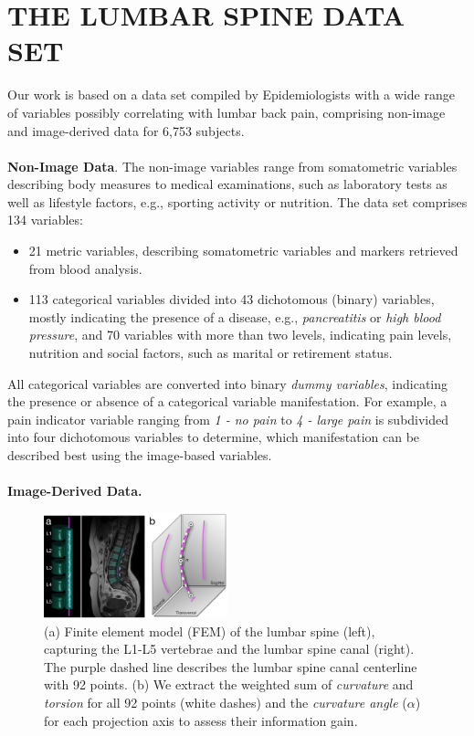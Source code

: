 \documentclass[a4paper,twoside]{style/article}
\begin{document}
\section{\uppercase{The Lumbar Spine Data Set}}
\label{sec:MaterialsAndMethod}
\noindent Our work is based on a data set compiled by Epidemiologists with a wide range of variables possibly correlating with lumbar back pain, comprising non-image and image-derived data for 6,753 subjects.
\\\\
\noindent \textbf{Non-Image Data}.
The non-image variables range from somatometric variables describing body measures to medical examinations, such as laboratory tests as well as lifestyle factors, e.g., sporting activity or nutrition.
The data set comprises 134 variables: %
\begin{itemize}
	\item 21 metric variables, describing somatometric variables and markers retrieved from blood analysis.
	\item 113 categorical variables divided into 43 dichotomous (binary) variables, mostly indicating the presence of a disease, e.g., \emph{pancreatitis} or \emph{high blood pressure}, and 70 variables with more than two levels, indicating pain levels, nutrition and social factors, such as marital or retirement status.
\end{itemize}
All categorical variables are converted into binary \emph{dummy variables}, indicating the presence or absence of a categorical variable manifestation.
For example, a pain indicator variable ranging from \emph{1 - no pain} to \emph{4 - large pain} is subdivided into four dichotomous variables to determine, which manifestation can be described best using the image-based variables.
\\\\
\noindent \textbf{Image-Derived Data.}
\begin{figure}[!t]
  \centering
  \includegraphics[width=0.475\textwidth]{figures/centerline}
  \caption{
	(a) Finite element model (FEM) of the lumbar spine (left), capturing the L1-L5 vertebrae and the lumbar spine canal (right).
	The purple dashed line describes the lumbar spine canal centerline with 92 points.
	(b) We extract the weighted sum of \emph{curvature} and \emph{torsion} for all 92 points (white dashes) and the \emph{curvature angle} ($\alpha$) for each projection axis to assess their information gain. %
	}
  \label{fig:centerline}
\end{figure}
\end{document}
